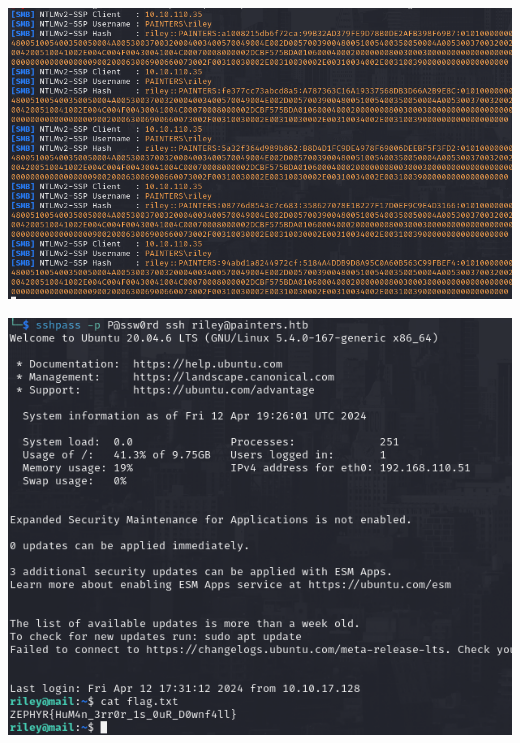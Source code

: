 \documentclass[a4paper]{article}
\begin{document}
              \begin{minipage}[c]{\textwidth}
          \centering
          \includegraphics[width=\textwidth]{src/issues/5 - PREMONITION/issue53.png}
          \label{5:PREMONITION:issue.md:issue53.png}
          \vspace{4ex}
        \end{minipage}
              \begin{minipage}[c]{\textwidth}
          \centering
          \includegraphics[width=\textwidth]{src/issues/5 - PREMONITION/issue54.png}
          \label{5:PREMONITION:issue.md:issue54.png}
          \vspace{4ex}
        \end{minipage}
          
    \clearpage

    
\end{document}
